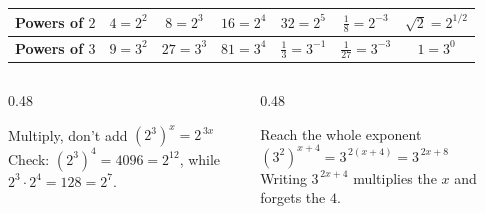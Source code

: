 \documentclass[aspectratio=169, 11pt]{beamer}
\begin{document}
\begin{frame}[t, plain]
  \begin{center}
  \footnotesize
  \renewcommand{\arraystretch}{1.35}
  \begin{tabular}{|l|c|c|c|c|c|c|}
  \hline
  \textbf{Powers of $2$} & $4=2^{2}$ & $8=2^{3}$ & $16=2^{4}$ & $32=2^{5}$ & $\frac18=2^{-3}$ & $\sqrt2=2^{1/2}$ \\
  \hline
  \textbf{Powers of $3$} & $9=3^{2}$ & $27=3^{3}$ & $81=3^{4}$ & $\frac13=3^{-1}$ & $\frac1{27}=3^{-3}$ & $1=3^{0}$ \\
  \hline
  \end{tabular}
  \end{center}
  \vspace{8pt}
  \begin{columns}[T]
    \begin{column}{0.48\textwidth}
      \begin{block}{Multiply, don't add}
        $\left(2^{3}\right)^{x}=2^{\,3x}$ \\[3pt]
        {\scriptsize Check: $\left(2^{3}\right)^{4}=4096=2^{12}$, while $2^{3}\cdot2^{4}=128=2^{7}$.}
      \end{block}
    \end{column}
    \begin{column}{0.48\textwidth}
      \begin{block}{Reach the whole exponent}
        $\left(3^{2}\right)^{x+4}=3^{\,2(x+4)}=3^{\,2x+8}$ \\[3pt]
        {\scriptsize Writing $3^{\,2x+4}$ multiplies the $x$ and forgets the $4$.}
      \end{block}
    \end{column}
  \end{columns}
\end{frame}
\end{document}
